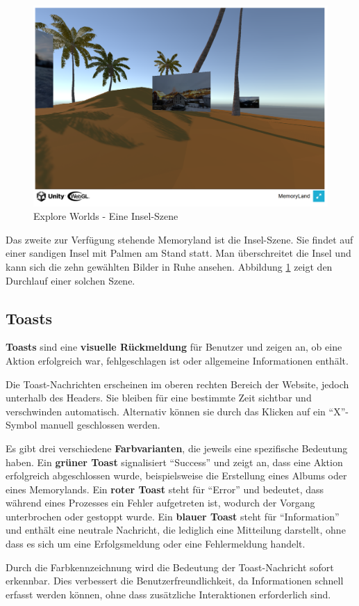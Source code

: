 \begin{figure} [h t]
    \centering
    \includegraphics[scale=0.5]{pics/explore_worlds_island.PNG}
    \caption{Explore Worlds - Eine Insel-Szene}
    \label{fig:explore-worlds-island}
\end{figure}



Das zweite zur Verfügung stehende Memoryland ist die Insel-Szene. Sie findet auf einer sandigen Insel mit Palmen am Stand statt. Man überschreitet die Insel und kann sich die zehn gewählten Bilder in Ruhe ansehen. Abbildung \ref{fig:explore-worlds-island} zeigt den Durchlauf einer solchen Szene.


\subsection{Toasts}

\textbf{Toasts} sind eine \textbf{visuelle Rückmeldung} für Benutzer und zeigen an, ob eine Aktion erfolgreich war, fehlgeschlagen ist oder allgemeine Informationen enthält.  

Die Toast-Nachrichten erscheinen im oberen rechten Bereich der Website, jedoch unterhalb des Headers. Sie bleiben für eine bestimmte Zeit sichtbar und verschwinden automatisch. Alternativ können sie durch das Klicken auf ein ``X''-Symbol manuell geschlossen werden.  

Es gibt drei verschiedene \textbf{Farbvarianten}, die jeweils eine spezifische Bedeutung haben. Ein \textbf{grüner Toast} signalisiert ``Success'' und zeigt an, dass eine Aktion erfolgreich abgeschlossen wurde, beispielsweise die Erstellung eines Albums oder eines Memorylands. Ein \textbf{roter Toast} steht für ``Error'' und bedeutet, dass während eines Prozesses ein Fehler aufgetreten ist, wodurch der Vorgang unterbrochen oder gestoppt wurde. Ein \textbf{blauer Toast} steht für ``Information'' und enthält eine neutrale Nachricht, die lediglich eine Mitteilung darstellt, ohne dass es sich um eine Erfolgsmeldung oder eine Fehlermeldung handelt.


Durch die Farbkennzeichnung wird die Bedeutung der Toast-Nachricht sofort erkennbar. Dies verbessert die Benutzerfreundlichkeit, da Informationen schnell erfasst werden 
können, ohne dass zusätzliche Interaktionen erforderlich sind.




